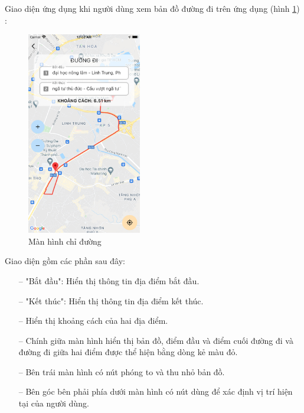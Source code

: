Giao diện ứng dụng khi người dùng xem bản đồ đường đi trên ứng dụng (hình \ref{fig:screen-map}) :
\begin{figure}[H]
    \centering
    \includegraphics[width=5cm]{images/Screen-Map.png}
    \caption{Màn hình chỉ đường}
    \label{fig:screen-map}
\end{figure}

Giao diện gồm các phần sau đây:
\begin{itemize}
    \item[--] "Bắt đầu": Hiển thị thông tin địa điểm bắt đầu.
    \item[--] "Kết thúc": Hiển thị thông tin địa điểm kết thúc.
    \item[--] Hiển thị khoảng cách của hai địa điểm.
    \item[--] Chính giữa màn hình hiển thị bản đồ, điểm đầu và điểm cuối đường đi và đường đi giữa hai điểm được thể hiện bằng dòng kẻ màu đỏ.
    \item[--] Bên trái màn hình có nút phóng to và thu nhỏ bản đồ.
    \item[--] Bên góc bên phải phía dưới màn hình có nút dùng để xác định vị trí hiện tại của người dùng.
\end{itemize}
